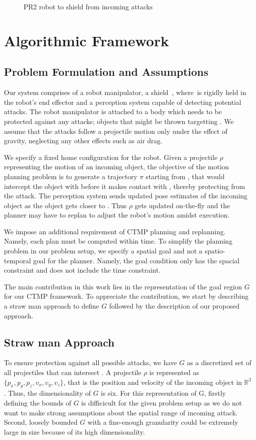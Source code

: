 \documentclass[a4paper]{report}
\begin{document}
\begin{figure}[H]
\centering
\caption{PR2 robot to shield from incoming attacks}
\label{fig:shield_pr2}
\end{figure}

\section{Algorithmic Framework}
\subsection{Problem Formulation and Assumptions}
Our system comprises of a robot manipulator, a shield~\calS, where~\calS is rigidly held in the robot's end effector and a perception system capable of detecting potential attacks. The robot manipulator is attached to a body \calB which needs to be protected against any attacks; objects that might be thrown targetting \calB. We assume that the attacks follow a projectile motion only under the effect of gravity, neglecting any other effects such as air drag.

We specify a fixed home configuration \Shome for the robot. Given a projectile $\rho$ representing the motion of an incoming object, the objective of the motion planning problem is to generate a trajectory $\pi$ starting from \Shome, that would intercept the object with \calS before it makes contact with \calB, thereby protecting \calB from the attack.
%
The perception system sends updated pose estimates of the incoming object as the object gets closer to \calB. Thus $\rho$ gets updated on-the-fly and the planner may have to replan to adjust the robot's motion amidst execution.

We impose an additional requirement of CTMP planning and replanning. Namely, each plan must be computed within \Tbound time. To simplify the planning problem in our problem setup, we specify a spatial goal and not a spatio-temporal goal for the planner. Namely, the goal condition only has the spacial constraint and does not include the time constraint.

The main contribution in this work lies in the representation of the goal region $G$ for our CTMP framework. To appreciate the contribution, we start by describing a straw man approach to define $G$ followed by the description of our proposed approach.

\subsection{Straw man Approach}
To ensure protection against all possible attacks, we have $G$ as a discretized set of all projectiles that can intersect \calB. A projectile $\rho$ is represented as $\{p_x,p_y,p_z,v_x,v_y,v_z\}$, that is the  position and velocity of the incoming object in $\mathbb{R}^3$. Thus, the dimensionality of $G$ is six. For this representation of G, firstly defining the bounds of $G$ is difficicult for the given problem setup as we do not want to make strong assumptions about the spatial range of incoming attack. Second, loosely bounded $G$ with a fine-enough granularity could be extremely large in size because of its high dimensionality.
\end{document}
